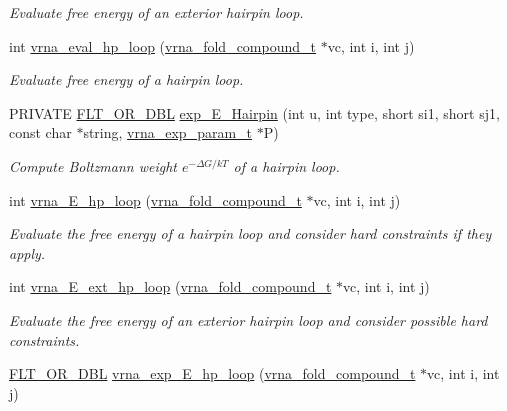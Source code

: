 \begin{DoxyCompactItemize}
\begin{DoxyCompactList}\small\item\em Evaluate free energy of an exterior hairpin loop. \end{DoxyCompactList}\item 
int \hyperlink{group__loops_gab3eb4651dc26dc2b653a57dd340d7e68}{vrna\+\_\+eval\+\_\+hp\+\_\+loop} (\hyperlink{group__fold__compound_ga1b0cef17fd40466cef5968eaeeff6166}{vrna\+\_\+fold\+\_\+compound\+\_\+t} $\ast$vc, int i, int j)
\begin{DoxyCompactList}\small\item\em Evaluate free energy of a hairpin loop. \end{DoxyCompactList}\item 
P\+R\+I\+V\+A\+TE \hyperlink{group__data__structures_ga31125aeace516926bf7f251f759b6126}{F\+L\+T\+\_\+\+O\+R\+\_\+\+D\+BL} \hyperlink{group__loops_ga51fb555974f180b78d76142b2894851c}{exp\+\_\+\+E\+\_\+\+Hairpin} (int u, int type, short si1, short sj1, const char $\ast$string, \hyperlink{group__energy__parameters_ga01d8b92fe734df8d79a6169482c7d8d8}{vrna\+\_\+exp\+\_\+param\+\_\+t} $\ast$P)
\begin{DoxyCompactList}\small\item\em Compute Boltzmann weight $e^{-\Delta G/kT} $ of a hairpin loop. \end{DoxyCompactList}\item 
int \hyperlink{group__loops_ga999ba163a8148d72fd5f22819a681df7}{vrna\+\_\+\+E\+\_\+hp\+\_\+loop} (\hyperlink{group__fold__compound_ga1b0cef17fd40466cef5968eaeeff6166}{vrna\+\_\+fold\+\_\+compound\+\_\+t} $\ast$vc, int i, int j)
\begin{DoxyCompactList}\small\item\em Evaluate the free energy of a hairpin loop and consider hard constraints if they apply. \end{DoxyCompactList}\item 
int \hyperlink{group__loops_gac3393ee309372eccae944e3a07f455f9}{vrna\+\_\+\+E\+\_\+ext\+\_\+hp\+\_\+loop} (\hyperlink{group__fold__compound_ga1b0cef17fd40466cef5968eaeeff6166}{vrna\+\_\+fold\+\_\+compound\+\_\+t} $\ast$vc, int i, int j)
\begin{DoxyCompactList}\small\item\em Evaluate the free energy of an exterior hairpin loop and consider possible hard constraints. \end{DoxyCompactList}\item 
\hyperlink{group__data__structures_ga31125aeace516926bf7f251f759b6126}{F\+L\+T\+\_\+\+O\+R\+\_\+\+D\+BL} \hyperlink{group__loops_gac9f49b31d3ec1d9040798b05506c71da}{vrna\+\_\+exp\+\_\+\+E\+\_\+hp\+\_\+loop} (\hyperlink{group__fold__compound_ga1b0cef17fd40466cef5968eaeeff6166}{vrna\+\_\+fold\+\_\+compound\+\_\+t} $\ast$vc, int i, int j)

\end{DoxyCompactItemize}
